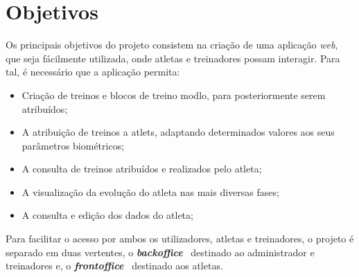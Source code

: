 \section{Objetivos}

Os principais objetivos do projeto consistem na criação de uma aplicação \textit{web}, que seja fácilmente utilizada, onde atletas e treinadores possam interagir. Para tal, é necessário que a aplicação permita:

\begin{itemize}
	\item Criação de treinos e blocos de treino modlo, para posteriormente serem atribuídos;
	\item A atribuição de treinos a atlets, adaptando determinados valores aos seus parâmetros biométricos;
	\item A consulta de treinos atribuídos e realizados pelo atleta;
	\item A visualização da evolução do atleta nas mais diversas fases;
	\item A consulta e edição dos dados do atleta;
\end{itemize}

Para facilitar o acesso por ambos os utilizadores, atletas e treinadores, o projeto é separado em duas vertentes, o \textit{\textbf{backoffice}} \textemdash~destinado ao administrador e treinadores e, o \textbf{\textit{frontoffice}} \textemdash~destinado aos atletas.
